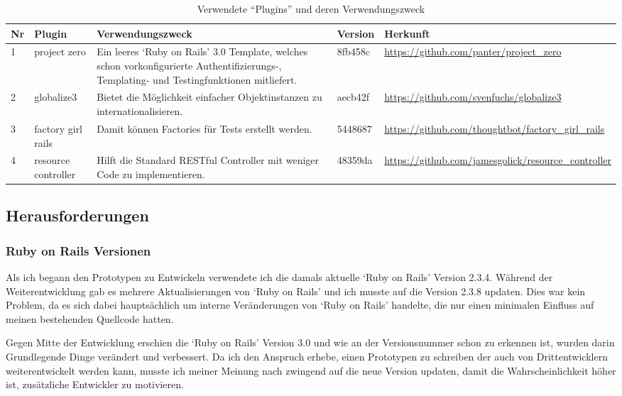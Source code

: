 \begin{table}[ht]
\begin{center}
    \begin{tabular}{llp{6cm}lp{3cm}}
        \toprule Nr & Plugin & Verwendungszweck & Version & Herkunft \\
        \midrule 1 & project zero & Ein leeres `Ruby on Rails' 3.0 Template, welches
                 schon vorkonfigurierte Authentifizierungs-, Templating- und Testingfunktionen
                 mitliefert. & 8fb458c & \url{https://github.com/panter/project_zero} \\
        \midrule 2 & globalize3 & Bietet die Möglichkeit einfacher Objektinstanzen
                 zu internationalisieren. & aecb42f & \url{https://github.com/svenfuchs/globalize3} \\
        \midrule 3 & factory girl rails & Damit können Factories \cite{factory} für Tests
                 erstellt werden. & 5448687 & \url{https://github.com/thoughtbot/factory_girl_rails} \\
        \midrule 4 & resource controller & Hilft die Standard RESTful \cite{restful} Controller mit weniger Code
                 zu implementieren. & 48359da & \url{https://github.com/jamesgolick/resource_controller} \\
        \bottomrule
    \end{tabular}
    \caption{Verwendete ``Plugins'' und deren Verwendungszweck}
    \label{tab:plugins}
\end{center}
\end{table}

\clearpage

\subsection{Herausforderungen}
\subsubsection{Ruby on Rails Versionen}
Als ich begann den Prototypen zu Entwickeln verwendete ich die damals aktuelle
`Ruby on Rails' Version 2.3.4. Während der Weiterentwicklung gab es mehrere
Aktualisierungen von `Ruby on Rails' und ich musste auf die Version 2.3.8
updaten. Dies war kein Problem, da es sich dabei hauptsächlich um interne
Veränderungen von `Ruby on Rails' handelte, die nur einen minimalen Einfluss 
auf meinen bestehenden Quellcode hatten.

Gegen Mitte der Entwicklung erschien die `Ruby on Rails' Version 3.0 und wie
an der Versionsnummer schon zu erkennen ist, wurden darin Grundlegende Dinge
verändert und verbessert. Da ich den Anspruch erhebe, einen Prototypen zu schreiben
der auch von Drittentwicklern weiterentwickelt werden kann, musste ich meiner
Meinung nach zwingend auf die neue Version updaten, damit die Wahrscheinlichkeit
höher ist, zusätzliche Entwickler zu motivieren.

